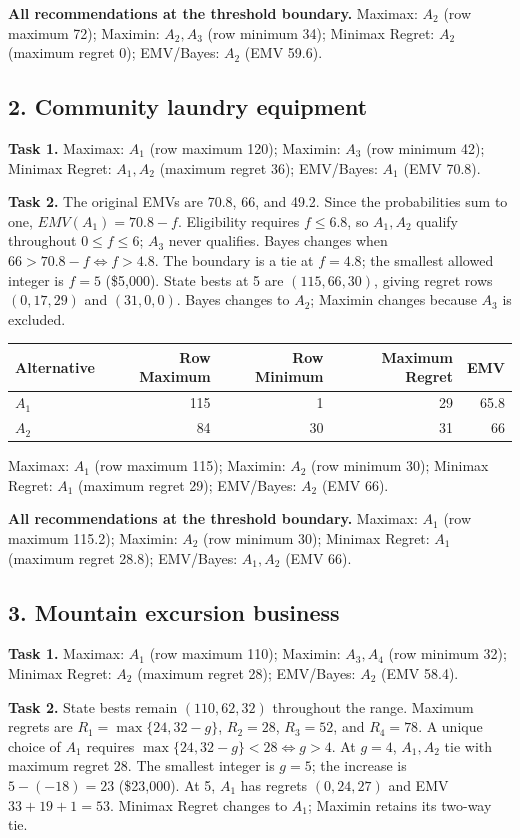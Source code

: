 \textbf{All recommendations at the threshold boundary.} Maximax: $A_2$ (row maximum 72); Maximin: $A_2,A_3$ (row minimum 34); Minimax Regret: $A_2$ (maximum regret 0); EMV/Bayes: $A_2$ (EMV 59.6).
\subsection*{2. Community laundry equipment}
\textbf{Task 1.} Maximax: $A_1$ (row maximum 120); Maximin: $A_3$ (row minimum 42); Minimax Regret: $A_1,A_2$ (maximum regret 36); EMV/Bayes: $A_1$ (EMV 70.8).

\textbf{Task 2.} The original EMVs are 70.8, 66, and 49.2. Since the probabilities sum to one, $EMV(A_1)=70.8-f$. Eligibility requires $f\leq6.8$, so $A_1,A_2$ qualify throughout $0\leq f\leq6$; $A_3$ never qualifies. Bayes changes when $66>70.8-f\iff f>4.8$. The boundary is a tie at $f=4.8$; the smallest allowed integer is $f=5$ (\$5,000). State bests at 5 are $(115,66,30)$, giving regret rows $(0,17,29)$ and $(31,0,0)$. Bayes changes to $A_2$; Maximin changes because $A_3$ is excluded.

\begin{center}\begin{tabular}{lrrrr}\toprule Alternative & Row Maximum & Row Minimum & Maximum Regret & EMV\\\midrule
$A_1$ & 115 & 1 & 29 & 65.8\\
$A_2$ & 84 & 30 & 31 & 66\\
\bottomrule\end{tabular}\end{center}
Maximax: $A_1$ (row maximum 115); Maximin: $A_2$ (row minimum 30); Minimax Regret: $A_1$ (maximum regret 29); EMV/Bayes: $A_2$ (EMV 66).

\textbf{All recommendations at the threshold boundary.} Maximax: $A_1$ (row maximum 115.2); Maximin: $A_2$ (row minimum 30); Minimax Regret: $A_1$ (maximum regret 28.8); EMV/Bayes: $A_1,A_2$ (EMV 66).
\newpage
\subsection*{3. Mountain excursion business}
\textbf{Task 1.} Maximax: $A_1$ (row maximum 110); Maximin: $A_3,A_4$ (row minimum 32); Minimax Regret: $A_2$ (maximum regret 28); EMV/Bayes: $A_2$ (EMV 58.4).

\textbf{Task 2.} State bests remain $(110,62,32)$ throughout the range. Maximum regrets are $R_1=\max\{24,32-g\}$, $R_2=28$, $R_3=52$, and $R_4=78$. A unique choice of $A_1$ requires $\max\{24,32-g\}<28\iff g>4$. At $g=4$, $A_1,A_2$ tie with maximum regret 28. The smallest integer is $g=5$; the increase is $5-(-18)=23$ (\$23,000). At 5, $A_1$ has regrets $(0,24,27)$ and EMV $33+19+1=53$. Minimax Regret changes to $A_1$; Maximin retains its two-way tie.

